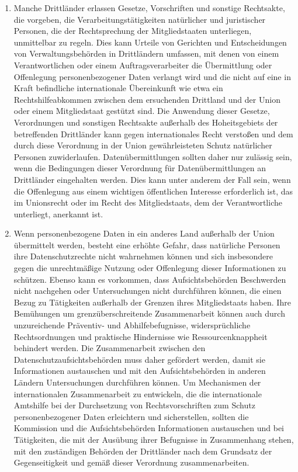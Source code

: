 \begin{enumerate}
   \item Manche Drittländer erlassen Gesetze, Vorschriften und sonstige Rechtsakte, die vorgeben, die
    Verarbeitungstätigkeiten natürlicher und juristischer Personen, die der Rechtsprechung der Mitgliedstaaten
    unterliegen, unmittelbar zu regeln. Dies kann Urteile von Gerichten und Entscheidungen von Verwaltungsbehörden in
    Drittländern umfassen, mit denen von einem Verantwortlichen oder einem Auftragsverarbeiter die Übermittlung oder
    Offenlegung personenbezogener Daten verlangt wird und die nicht auf eine in Kraft befindliche internationale
    Übereinkunft wie etwa ein Rechtshilfeabkommen zwischen dem ersuchenden Drittland und der Union oder einem
    Mitgliedstaat gestützt sind. Die Anwendung dieser Gesetze, Verordnungen und sonstigen Rechtsakte außerhalb des
    Hoheitsgebiets der betreffenden Drittländer kann gegen internationales Recht verstoßen und dem durch diese
    Verordnung in der Union gewährleisteten Schutz natürlicher Personen zuwiderlaufen. Datenübermittlungen sollten
    daher nur zulässig sein, wenn die Bedingungen dieser Verordnung für Datenübermittlungen an Drittländer eingehalten
    werden. Dies kann unter anderem der Fall sein, wenn die Offenlegung aus einem wichtigen öffentlichen Interesse
    erforderlich ist, das im Unionsrecht oder im Recht des Mitgliedstaats, dem der Verantwortliche unterliegt,
    anerkannt ist.%
   \label{itm:eg-115}
   

   \item Wenn personenbezogene Daten in ein anderes Land außerhalb der Union übermittelt werden, besteht eine erhöhte
    Gefahr, dass natürliche Personen ihre Datenschutzrechte nicht wahrnehmen können und sich insbesondere gegen die
    unrechtmäßige Nutzung oder Offenlegung dieser Informationen zu schützen. Ebenso kann es vorkommen, dass
    Aufsichtsbehörden Beschwerden nicht nachgehen oder Untersuchungen nicht durchführen können, die einen Bezug zu
    Tätigkeiten außerhalb der Grenzen ihres Mitgliedstaats haben. Ihre Bemühungen um grenzüberschreitende
    Zusammenarbeit können auch durch unzureichende Präventiv- und Abhilfebefugnisse, widersprüchliche Rechtsordnungen
    und praktische Hindernisse wie Ressourcenknappheit behindert werden. Die Zusammenarbeit zwischen den
    Datenschutzaufsichtsbehörden muss daher gefördert werden, damit sie Informationen austauschen und mit den
    Aufsichtsbehörden in anderen Ländern Untersuchungen durchführen können. Um Mechanismen der internationalen
    Zusammenarbeit zu entwickeln, die die internationale Amtshilfe bei der Durchsetzung von Rechtsvorschriften zum
    Schutz personenbezogener Daten erleichtern und sicherstellen, sollten die Kommission und die Aufsichtsbehörden
    Informationen austauschen und bei Tätigkeiten, die mit der Ausübung ihrer Befugnisse in Zusammenhang stehen, mit
    den zuständigen Behörden der Drittländer nach dem Grundsatz der Gegenseitigkeit und gemäß dieser Verordnung
    zusammenarbeiten.%
   \label{itm:eg-116}
   

\end{enumerate}
